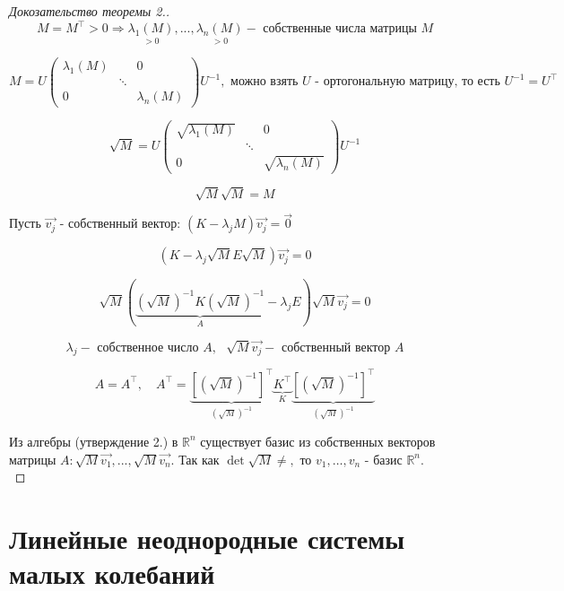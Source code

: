 \documentclass[12pt, a4paper]{report}
\begin{document}
\fi


\begin{proof}[Докозательство теоремы 2.]
    \[  \] 
    \[ M = M ^{ \top } > 0 \Rightarrow \underset{>0}{\lambda_1 (M )},..., \underset{>0}{\lambda_n (M )} - \text{ собственные числа матрицы }  M \] 

    \[ M = U \begin{pmatrix}
    \lambda_1 (M) &  & 0\\
     & \ddots & \\
    0 &  & \lambda_n(M)
    \end{pmatrix} U^{-1} , \text{ можно взять } U \text{ - ортогональную матрицу, то есть } U^{ -1} = U^{\top}    \] 


\[ \sqrt{M} = U \begin{pmatrix}
    \sqrt{\lambda_1 (M)} &  & 0\\
     & \ddots & \\
    0 &  & \sqrt{\lambda_n(M)}
    \end{pmatrix}  U^{-1} \] 

    \[ \sqrt{M} \sqrt{M}  =M\]

    Пусть \( \vec{v_j}   \) - собственный вектор: \( (K- \lambda_j M ) \vec{v_j } =\vec{0}   \) 

    \[ (K - \lambda_j \sqrt{M } E \sqrt{M }) \vec{v_j} = 0 \] 

    \[ \sqrt{M } (\underbrace{(\sqrt{M })^{-1} K (\sqrt{M})^{-1}}_{A} - \lambda_j E   ) \sqrt{M } \vec{v_j} = 0 \] 

    \[ \lambda_j - \text{ собственное число } A , \text{ }  \sqrt{ M } \vec{v_j } -\text{ собственный вектор  }  A \] 

    \[ A= A^{\top} , \quad  A^{\top } =\underbrace{ [(\sqrt{M } )^{-1} ]^{\top }}_{(\sqrt{M })^{-1} } \underbrace{K^{\top }}_{K} \underbrace{ [(\sqrt{M } )^{-1} ]^{\top }}_{(\sqrt{M })^{-1} }    \] 

    Из алгебры (утверждение 2.) в \( \mathbb{R}     ^{ n }  \) существует базис из собственных векторов матрицы \( A : \sqrt{M }\vec{v_1 },..., \sqrt{M } \vec{v_n}    \). Так как \( \det \sqrt{M } \neq ,  \)  то \( v_1, \ldots, v_n \) - базис \( \mathbb{R} ^n  \). 
    \[  \] 
\end{proof}
 

\section{Линейные неоднородные системы  малых колебаний}
\end{document}

